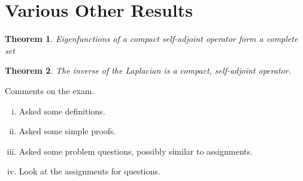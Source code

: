 \documentclass[10pt, oneside, reqno]{amsart}
\theoremstyle{plain}%
\newtheorem{thm}{Theorem}[section]
\numberwithin{equation}{section}
\theoremstyle{definition}
\theoremstyle{remark}
\begin{document}
\section{Various Other Results} %
\label{sec:various_other_results}

\begin{thm}
    Eigenfunctions of a compact self-adjoint operator form a complete set 
\end{thm}

\begin{thm}
    The inverse of the Laplacian is a compact, self-adjoint operator.
\end{thm}

Comments on the exam.

\begin{enumerate}[(i)]
    \item Asked some definitions.
    \item Asked some simple proofs.
    \item Asked some problem questions, possibly similar to assignments.
    \item Look at the assignments for questions.
\end{enumerate} 
\end{document}

